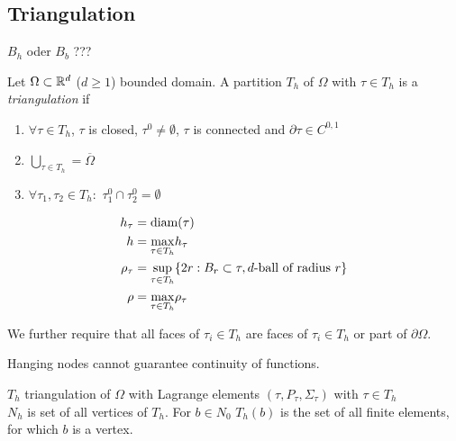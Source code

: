 
\subsection{Triangulation}

\Large{ $B_h$ oder $B_b$ ???}

\begin{definition_}
	Let $\Omega \subset \mathbb{R}^d$ ($d \geq 1$) bounded domain. A partition $T_h$ of $\Omega$ with $\tau \in T_h$ is a \textit{triangulation} if
	\begin{enumerate}[label=\alph*)]
		\item $\forall \tau \in T_h$, $\tau$ is closed, $\tau^0 \neq \emptyset$, $\tau$ is connected and $\partial \tau \in C^{0,1}$
				
		\item $\bigcup \limits_{\tau \in T_h} = \overline{\Omega}$
		
		\item $\forall \tau_1,\tau_2 \in T_h:$ $\tau^0_1\cap \tau^0_2 = \emptyset$
	\end{enumerate}

	\begin{align*}
		h_{\tau} &= \text{diam} (\tau)\\
		h &= \underset{\tau \in T_h}{\max} h_{\tau}\\
		\rho_{\tau} &= \underset{\tau \in T_h}{\sup} \{2r: B_r \subset \tau, d\text{-ball of radius  }r \} \\
		\rho &= \underset{\tau \in T_h}{\max} \rho_{\tau}
	\end{align*}
\end{definition_}

We further require that all faces of $\tau_i \in T_h$ are faces of $\tau_i \in T_h$ or part of $\partial \Omega$.

Hanging nodes cannot guarantee continuity of functions.

$T_h$ triangulation of $\Omega$ with Lagrange elements $(\tau,P_\tau,\Sigma_\tau)$ with $\tau \in T_h$\\
$ N_h$ is set of all vertices of $T_h$. For $b\in N_0 $ $T_h(b) $ is the set of all finite elements, for which $b$ is a vertex.

